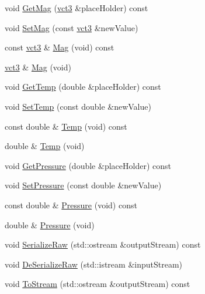 \begin{DoxyCompactItemize}
\item 
void \hyperlink{classprm_i_m_u_sensors_a2b411076ee5ad07a1efc0579f155b439}{Get\-Mag} (\hyperlink{vct_fixed_size_vector_types_8h_a3af82acdbf4eeb73c551909240b106ea}{vct3} \&place\-Holder) const 
\item 
void \hyperlink{classprm_i_m_u_sensors_a32caeecddd4645cf66e262cb3616f471}{Set\-Mag} (const \hyperlink{vct_fixed_size_vector_types_8h_a3af82acdbf4eeb73c551909240b106ea}{vct3} \&new\-Value)
\item 
const \hyperlink{vct_fixed_size_vector_types_8h_a3af82acdbf4eeb73c551909240b106ea}{vct3} \& \hyperlink{classprm_i_m_u_sensors_a5953c853628f80037e25aa74cb838f6c}{Mag} (void) const 
\item 
\hyperlink{vct_fixed_size_vector_types_8h_a3af82acdbf4eeb73c551909240b106ea}{vct3} \& \hyperlink{classprm_i_m_u_sensors_ae8bd56f3961cd7474362fb7fe71bf3a1}{Mag} (void)
\item 
void \hyperlink{classprm_i_m_u_sensors_a5ad8f54818693ea340ed9588b78b4b2a}{Get\-Temp} (double \&place\-Holder) const 
\item 
void \hyperlink{classprm_i_m_u_sensors_a50d32b5dc243c0ebc92f74897fcc003b}{Set\-Temp} (const double \&new\-Value)
\item 
const double \& \hyperlink{classprm_i_m_u_sensors_acef6ba2cba7affc1c9a4ccc2b7a3f813}{Temp} (void) const 
\item 
double \& \hyperlink{classprm_i_m_u_sensors_a00f63260089ad1fc5816a27f10f401f6}{Temp} (void)
\item 
void \hyperlink{classprm_i_m_u_sensors_a0644e33374e81c6cbf58515799b5e9cf}{Get\-Pressure} (double \&place\-Holder) const 
\item 
void \hyperlink{classprm_i_m_u_sensors_a0e11b11d7c7401bc395517787da36a90}{Set\-Pressure} (const double \&new\-Value)
\item 
const double \& \hyperlink{classprm_i_m_u_sensors_a0c06f98ad9189f5bc3b95312212819c5}{Pressure} (void) const 
\item 
double \& \hyperlink{classprm_i_m_u_sensors_a4195e35726700ac110a0d267490f9d5f}{Pressure} (void)
\item 
void \hyperlink{classprm_i_m_u_sensors_a7fbac0911934e6ede0f6fea322ab0528}{Serialize\-Raw} (std\-::ostream \&output\-Stream) const 
\item 
void \hyperlink{classprm_i_m_u_sensors_afba3de04ddede05cd0d30645ef6c1804}{De\-Serialize\-Raw} (std\-::istream \&input\-Stream)
\item 
void \hyperlink{classprm_i_m_u_sensors_a89d31388a21cc708da3c09a7179a1012}{To\-Stream} (std\-::ostream \&output\-Stream) const 

\end{DoxyCompactItemize}
